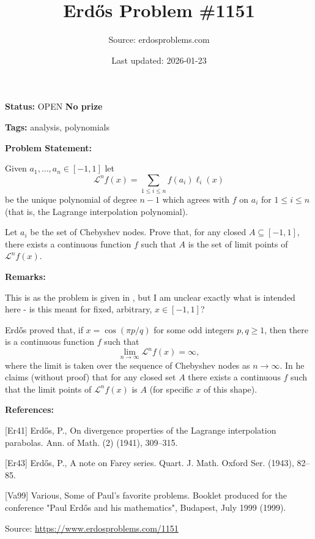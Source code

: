 \documentclass{article}
\title{Erd\H{o}s Problem \#1151}
\date{Last updated: 2026-01-23}
\author{Source: erdosproblems.com}
\begin{document}
\maketitle

\noindent\textbf{Status:} OPEN \quad \textbf{No prize}

\noindent\textbf{Tags:} analysis, polynomials

\medskip
\noindent\textbf{Problem Statement:}

Given $a_1,\ldots,a_n\in [-1,1]$ let\[\mathcal{L}^nf(x) = \sum_{1\leq i\leq n}f(a_i)\ell_i(x)\]be the unique polynomial of degree $n-1$ which agrees with $f$ on $a_i$ for $1\leq i\leq n$ (that is, the Lagrange interpolation polynomial).

Let $a_i$ be the set of Chebyshev nodes. Prove that, for any closed $A\subseteq [-1,1]$, there exists a continuous function $f$ such that $A$ is the set of limit points of $\mathcal{L}^nf(x)$.

\bigskip
\noindent\textbf{Remarks:}

This is as the problem is given in \cite{Va99}, but I am unclear exactly what is intended here - is this meant for fixed, arbitrary, $x\in [-1,1]$?

Erd\H{o}s \cite{Er41} proved that, if $x=\cos(\pi p/q)$ for some odd integers $p,q\geq 1$, then there is a continuous function $f$ such that\[\lim_{n\to \infty}\mathcal{L}^nf(x)=\infty,\]where the limit is taken over the sequence of Chebyshev nodes as $n\to \infty$. In \cite{Er43} he claims (without proof) that for any closed set $A$ there exists a continuous $f$ such that the limit points of $\mathcal{L}^nf(x)$ is $A$ (for specific $x$ of this shape).

\bigskip
\noindent\textbf{References:}

[Er41] Erd\H{o}s, P., On divergence properties of the {L}agrange interpolation
parabolas. Ann. of Math. (2) (1941), 309--315.
 
 [Er43] Erd\H{o}s, P., A note on {F}arey series. Quart. J. Math. Oxford Ser. (1943), 82--85.
 
 [Va99] Various, Some of Paul's favorite problems. Booklet produced for the conference "Paul Erd\H{o}s and his mathematics", Budapest, July 1999 (1999).

\bigskip
\noindent\small{Source: \url{https://www.erdosproblems.com/1151}}
\end{document}
